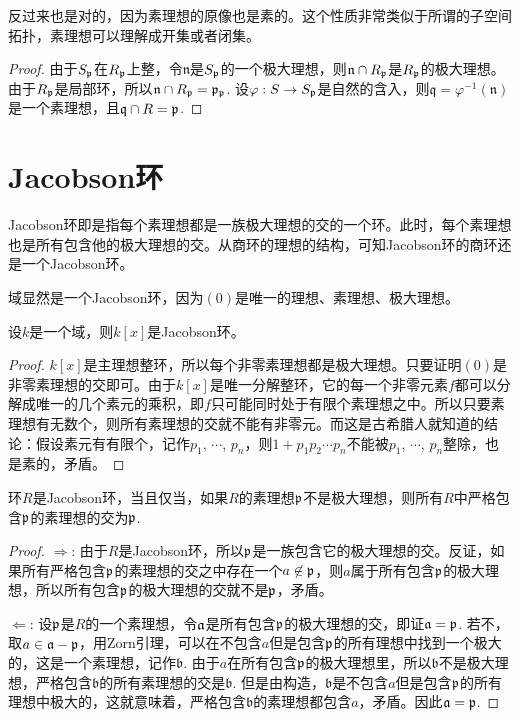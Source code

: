 反过来也是对的，因为素理想的原像也是素的。这个性质非常类似于所谓的子空间拓扑，素理想可以理解成开集或者闭集。

\begin{proof}
由于$S_{\mathfrak{p}}$在$R_{\mathfrak{p}}$上整，令$\mathfrak{n}$是$S_{\mathfrak{p}}$的一个极大理想，则$\mathfrak{n}\cap R_{\mathfrak{p}}$是$R_{\mathfrak{p}}$的极大理想。由于$R_{\mathfrak{p}}$是局部环，所以$\mathfrak{n}\cap R_{\mathfrak{p}}=\mathfrak{p}_{\mathfrak{p}}$. 设$\varphi:S\to S_{\mathfrak{p}}$是自然的含入，则$\mathfrak{q}=\varphi^{-1}(\mathfrak{n})$是一个素理想，且$\mathfrak{q}\cap R=\mathfrak{p}$.
\end{proof}

\section{Jacobson环}

\para Jacobson环即是指每个素理想都是一族极大理想的交的一个环。此时，每个素理想也是所有包含他的极大理想的交。从商环的理想的结构，可知Jacobson环的商环还是一个Jacobson环。

域显然是一个Jacobson环，因为$(0)$是唯一的理想、素理想、极大理想。

\para 设$k$是一个域，则$k[x]$是Jacobson环。

\begin{proof}
	$k[x]$是主理想整环，所以每个非零素理想都是极大理想。只要证明$(0)$是非零素理想的交即可。由于$k[x]$是唯一分解整环，它的每一个非零元素$f$都可以分解成唯一的几个素元的乘积，即$f$只可能同时处于有限个素理想之中。所以只要素理想有无数个，则所有素理想的交就不能有非零元。而这是古希腊人就知道的结论：假设素元有有限个，记作$p_1$, $\cdots$, $p_n$，则$1+p_1p_2\cdots p_n$不能被$p_1$, $\cdots$, $p_n$整除，也是素的，矛盾。
\end{proof}

\begin{pro}
环$R$是Jacobson环，当且仅当，如果$R$的素理想$\mathfrak{p}$不是极大理想，则所有$R$中严格包含$\mathfrak{p}$的素理想的交为$\mathfrak{p}$.
\end{pro}

\begin{proof} $\Rightarrow$: 由于$R$是Jacobson环，所以$\mathfrak{p}$是一族包含它的极大理想的交。反证，如果所有严格包含$\mathfrak{p}$的素理想的交之中存在一个$a\not\in \mathfrak{p}$，则$a$属于所有包含$\mathfrak{p}$的极大理想，所以所有包含$\mathfrak{p}$的极大理想的交就不是$\mathfrak{p}$，矛盾。

$\Leftarrow$: 设$\mathfrak{p}$是$R$的一个素理想，令$\mathfrak{a}$是所有包含$\mathfrak{p}$的极大理想的交，即证$\mathfrak{a}=\mathfrak{p}$. 若不，取$a\in \mathfrak{a}-\mathfrak{p}$，用Zorn引理，可以在不包含$a$但是包含$\mathfrak{p}$的所有理想中找到一个极大的，这是一个素理想，记作$\mathfrak{b}$. 由于$a$在所有包含$\mathfrak{p}$的极大理想里，所以$\mathfrak{b}$不是极大理想，严格包含$\mathfrak{b}$的所有素理想的交是$\mathfrak{b}$. 但是由构造，$\mathfrak{b}$是不包含$a$但是包含$\mathfrak{p}$的所有理想中极大的，这就意味着，严格包含$\mathfrak{b}$的素理想都包含$a$，矛盾。因此$\mathfrak{a}=\mathfrak{p}$.\end{proof}

